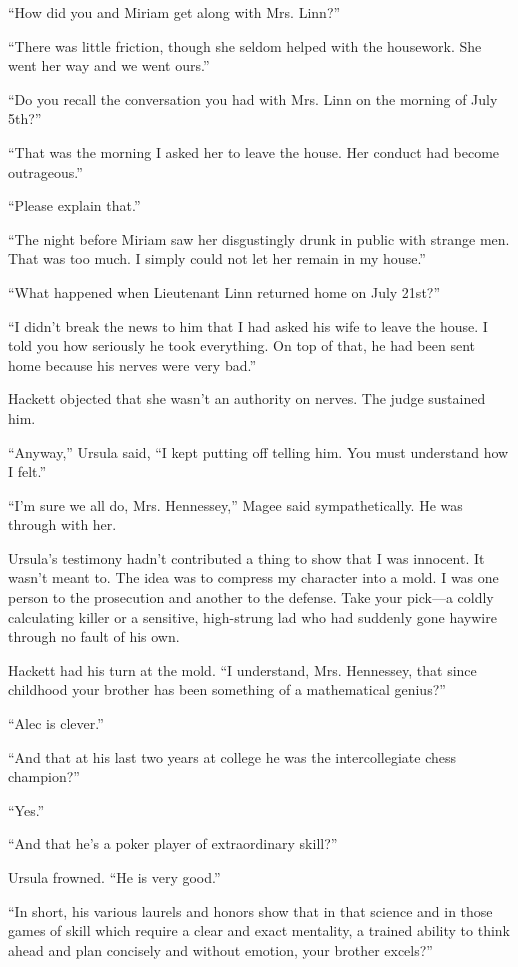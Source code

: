 \documentclass{novel}
\begin{document}
“How did you and Miriam get along with Mrs. Linn?”

“There was little friction, though she seldom helped with the housework. She went her way and we went ours.”

“Do you recall the conversation you had with Mrs. Linn on the morning of July 5th?”

“That was the morning I asked her to leave the house. Her conduct had become outrageous.”

“Please explain that.”

“The night before Miriam saw her disgustingly drunk in public with strange men. That was too much. I simply could not let her remain in my house.”

“What happened when Lieutenant Linn returned home on July 21st?”

“I didn’t break the news to him that I had asked his wife to leave the house. I told you how seriously he took everything. On top of that, he had been sent home because his nerves were very bad.”

\scenestars

Hackett objected that she wasn’t an authority on nerves. The judge sustained him.

“Anyway,” Ursula said, “I kept putting off telling him. You must understand how I felt.”

“I’m sure we all do, Mrs. Hennessey,” Magee said sympathetically. He was through with her.

Ursula’s testimony hadn’t contributed a thing to show that I was innocent. It wasn’t meant to. The idea was to compress my character into a mold. I was one person to the prosecution and another to the defense. Take your pick—a coldly calculating killer or a sensitive, high-strung lad who had suddenly gone haywire through no fault of his own.

Hackett had his turn at the mold. “I understand, Mrs. Hennessey, that since childhood your brother has been something of a mathematical genius?”

“Alec is clever.”

“And that at his last two years at college he was the intercollegiate chess champion?”

“Yes.”

“And that he’s a poker player of extraordinary skill?”

Ursula frowned. “He is very good.”

“In short, his various laurels and honors show that in that science and in those games of skill which require a clear and exact mentality, a trained ability to think ahead and plan concisely and without emotion, your brother excels?”
\end{document}
